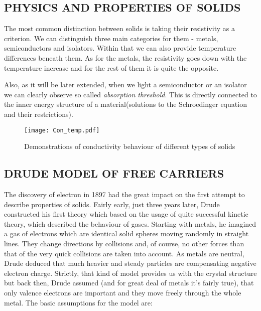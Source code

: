 
\subsection{PHYSICS AND PROPERTIES OF SOLIDS}
The most common distinction between solids is taking their resistivity as a criterion. We can distinguish three main categories for them - metals, semiconductors and isolators. Within that we can also provide temperature differences beneath them. As for the metals, the resistivity goes down with the temperature increase and for the rest of them it is quite the opposite.

Also, as it will be later extended, when we light a semiconductor or an isolator we can clearly observe so called \textit{absorption threshold}. This is directly connected to the inner energy structure of a material(solutions to the Schroedinger equation and their restrictions).

\begin{figure}[H]
\centering
\texttt{[image: Con\_temp.pdf]}
\caption{Demonstrations of conductivity behaviour of different types of solids}
\end{figure}

\subsection{DRUDE MODEL OF FREE CARRIERS}
The discovery of electron in 1897 had the great impact on the first attempt to describe properties of solids. Fairly early, just three years later, Drude constructed his first theory which based on the usage of quite successful kinetic theory, which described the behaviour of gases. Starting with metals, he imagined a gas of electrons which are identical solid spheres moving randomly in straight lines. They change directions by collisions and, of course, no other forces than that of the very quick collisions are taken into account. As metals are neutral, Drude deduced that much heavier and steady particles are compensating negative electron charge. Strictly, that kind of model provides us with the crystal structure but back then, Drude assumed (and for great deal of metals it's fairly true), that only valence electrons are important and they move freely through the whole metal. The basic assumptions for the model are:

